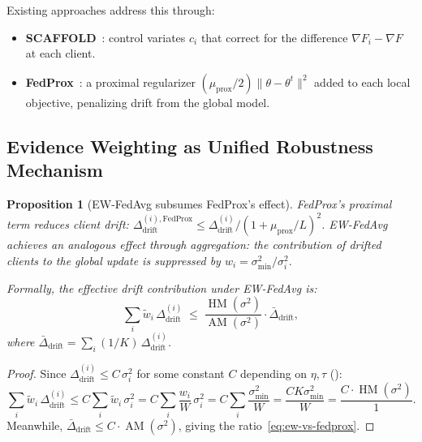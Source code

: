 \documentclass[11pt,a4paper]{article}
\newtheorem{proposition}[theorem]{Proposition}
\DeclareMathOperator{\AM}{AM}
\DeclareMathOperator{\HM}{HM}
\newcommand{\norm}[1]{\|#1\|}
\begin{document}
Existing approaches address this through:
\begin{itemize}
  \item \textbf{SCAFFOLD}~\cite{karimireddy2020}: control variates
    $c_i$ that correct for the difference $\nabla F_i - \nabla F$ at each
    client.
  \item \textbf{FedProx}~\cite{li2020fedprox}: a proximal regularizer
    $(\mu_{\text{prox}}/2)\norm{\theta - \theta^t}^2$ added to each local
    objective, penalizing drift from the global model.
\end{itemize}

\subsection{Evidence Weighting as Unified Robustness Mechanism}

\begin{proposition}[EW-FedAvg subsumes FedProx's effect]\label{prop:fedprox}
FedProx's proximal term reduces client drift:
$\Delta_{\text{drift}}^{(i),\text{FedProx}} \leq \Delta_{\text{drift}}^{(i)} / (1 + \mu_{\text{prox}}/L)^2$.
EW-FedAvg achieves an analogous effect through aggregation: the contribution
of drifted clients to the global update is suppressed by $w_i = \sigma_{\min}^2/\sigma_i^2$.

Formally, the effective drift contribution under EW-FedAvg is:
\begin{equation}\label{eq:ew-vs-fedprox}
  \sum_i \tilde{w}_i \,\Delta_{\text{drift}}^{(i)}
  \;\leq\; \frac{\HM(\sigma^2)}{\AM(\sigma^2)} \cdot \bar{\Delta}_{\text{drift}},
\end{equation}
where $\bar{\Delta}_{\text{drift}} = \sum_i (1/K)\,\Delta_{\text{drift}}^{(i)}$.
\end{proposition}

\begin{proof}
Since $\Delta_{\text{drift}}^{(i)} \leq C\,\sigma_i^2$ for some constant
$C$ depending on $\eta, \tau$ ():
\begin{equation}
  \sum_i \tilde{w}_i\,\Delta_{\text{drift}}^{(i)}
  \leq C \sum_i \tilde{w}_i\,\sigma_i^2
  = C \sum_i \frac{w_i}{W}\,\sigma_i^2
  = C \sum_i \frac{\sigma_{\min}^2}{W}
  = \frac{CK\sigma_{\min}^2}{W}
  = \frac{C \cdot \HM(\sigma^2)}{1}.
\end{equation}
Meanwhile, $\bar{\Delta}_{\text{drift}} \leq C \cdot \AM(\sigma^2)$,
giving the ratio~\eqref{eq:ew-vs-fedprox}.
\end{proof}
\end{document}
